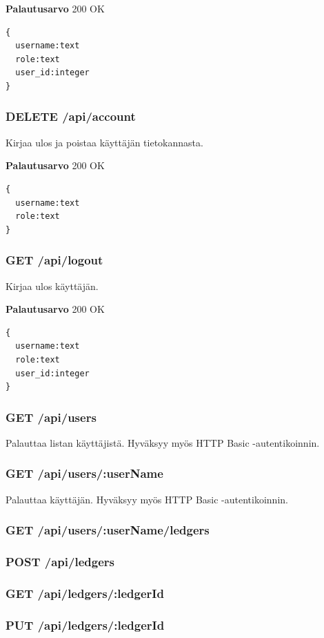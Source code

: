 \documentclass[a4paper,parskip=half]{scrartcl}
\begin{document}
\textbf{Palautusarvo}
200 OK
\begin{Verbatim}
{
  username:text
  role:text
  user_id:integer
}
\end{Verbatim}

\subsubsection{DELETE /api/account}
Kirjaa ulos ja poistaa käyttäjän tietokannasta.

\textbf{Palautusarvo}
200 OK
\begin{Verbatim}
{
  username:text
  role:text
}
\end{Verbatim}

\subsubsection{GET /api/logout}
Kirjaa ulos käyttäjän.

\textbf{Palautusarvo}
200 OK
\begin{Verbatim}
{
  username:text
  role:text
  user_id:integer
}
  \end{Verbatim}

\subsubsection{GET /api/users}
Palauttaa listan käyttäjistä. Hyväksyy myös HTTP Basic -autentikoinnin.

\subsubsection{GET /api/users/:userName}
Palauttaa käyttäjän. Hyväksyy myös HTTP Basic -autentikoinnin.

\subsubsection{GET /api/users/:userName/ledgers}

\subsubsection{POST /api/ledgers}

\subsubsection{GET /api/ledgers/:ledgerId}

\subsubsection{PUT /api/ledgers/:ledgerId}
\end{document}
